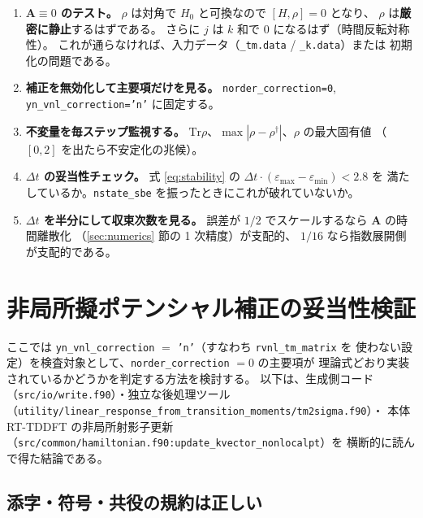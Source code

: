 \documentclass[dvipdfmx,a4paper,11pt]{jsarticle}
\newcommand{\file}[1]{\texttt{#1}}
\newcommand{\vA}{\bm{A}}
\newcommand{\Tr}{\mathrm{Tr}}
\newcommand{\eps}{\varepsilon}
\newcommand{\dt}{\Delta t}
\begin{document}
\begin{enumerate}
\item \textbf{$\vA \equiv 0$ のテスト。}
      $\rho$ は対角で $H_0$ と可換なので $[H,\rho] = 0$ となり、
      $\rho$ は\textbf{厳密に静止}するはずである。
      さらに $j$ は $k$ 和で $0$ になるはず（時間反転対称性）。
      これが通らなければ、入力データ（\file{\_tm.data} / \file{\_k.data}）または
      初期化の問題である。

\item \textbf{補正を無効化して主要項だけを見る。}
      \file{norder\_correction=0}, \file{yn\_vnl\_correction='n'} に固定する。

\item \textbf{不変量を毎ステップ監視する。}
      $\Tr\rho$、$\max|\rho - \rho^\dagger|$、$\rho$ の最大固有値
      （$[0,2]$ を出たら不安定化の兆候）。

\item \textbf{$\dt$ の妥当性チェック。}
      式 \eqref{eq:stability} の $\dt \cdot (\eps_{\max} - \eps_{\min}) < 2.8$ を
      満たしているか。\file{nstate\_sbe} を振ったときにこれが破れていないか。

\item \textbf{$\dt$ を半分にして収束次数を見る。}
      誤差が $1/2$ でスケールするなら $\vA$ の時間離散化
      （\ref{sec:numerics} 節の 1 次精度）が支配的、
      $1/16$ なら指数展開側が支配的である。
\end{enumerate}

\section{非局所擬ポテンシャル補正の妥当性検証}
\label{sec:vnl-verify}

ここでは \file{yn\_vnl\_correction} $=$ \file{'n'}（すなわち \file{rvnl\_tm\_matrix} を
使わない設定）を検査対象として、\file{norder\_correction} $= 0$ の主要項が
理論式どおり実装されているかどうかを判定する方法を検討する。
以下は、生成側コード（\file{src/io/write.f90}）・独立な後処理ツール
（\file{utility/linear\_response\_from\_transition\_moments/tm2sigma.f90}）・
本体 RT-TDDFT の非局所射影子更新
（\file{src/common/hamiltonian.f90:update\_kvector\_nonlocalpt}）を
横断的に読んで得た結論である。

\subsection{添字・符号・共役の規約は正しい}
\end{document}
